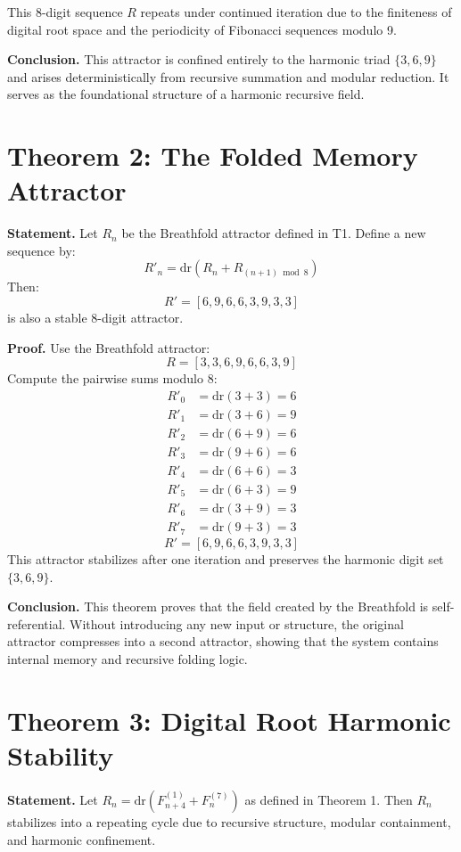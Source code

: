 \documentclass[12pt]{article}
\begin{document}
This 8-digit sequence \( R \) repeats under continued iteration due to the finiteness of digital root space and the periodicity of Fibonacci sequences modulo 9.

\textbf{Conclusion.} This attractor is confined entirely to the harmonic triad \(\{3, 6, 9\}\) and arises deterministically from recursive summation and modular reduction. It serves as the foundational structure of a harmonic recursive field.

\section*{Theorem 2: The Folded Memory Attractor}
\textbf{Statement.} Let \( R_n \) be the Breathfold attractor defined in T1. Define a new sequence by:
\[
R'_n = \mathrm{dr}(R_n + R_{(n+1) \bmod 8})
\]
Then:
\[
R' = [6, 9, 6, 6, 3, 9, 3, 3]
\]
is also a stable 8-digit attractor.

\textbf{Proof.} Use the Breathfold attractor:
\[
R = [3, 3, 6, 9, 6, 6, 3, 9]
\]
Compute the pairwise sums modulo 8:
\begin{align*}
R'_0 &= \mathrm{dr}(3 + 3) = 6 \\
R'_1 &= \mathrm{dr}(3 + 6) = 9 \\
R'_2 &= \mathrm{dr}(6 + 9) = 6 \\
R'_3 &= \mathrm{dr}(9 + 6) = 6 \\
R'_4 &= \mathrm{dr}(6 + 6) = 3 \\
R'_5 &= \mathrm{dr}(6 + 3) = 9 \\
R'_6 &= \mathrm{dr}(3 + 9) = 3 \\
R'_7 &= \mathrm{dr}(9 + 3) = 3
\end{align*}
\[
R' = [6, 9, 6, 6, 3, 9, 3, 3]
\]
This attractor stabilizes after one iteration and preserves the harmonic digit set \(\{3, 6, 9\}\).

\textbf{Conclusion.} This theorem proves that the field created by the Breathfold is self-referential. Without introducing any new input or structure, the original attractor compresses into a second attractor, showing that the system contains internal memory and recursive folding logic.

\section*{Theorem 3: Digital Root Harmonic Stability}
\textbf{Statement.} Let \( R_n = \mathrm{dr}(F^{(1)}_{n+4} + F^{(7)}_n) \) as defined in Theorem 1. Then \( R_n \) stabilizes into a repeating cycle due to recursive structure, modular containment, and harmonic confinement.
\end{document}
